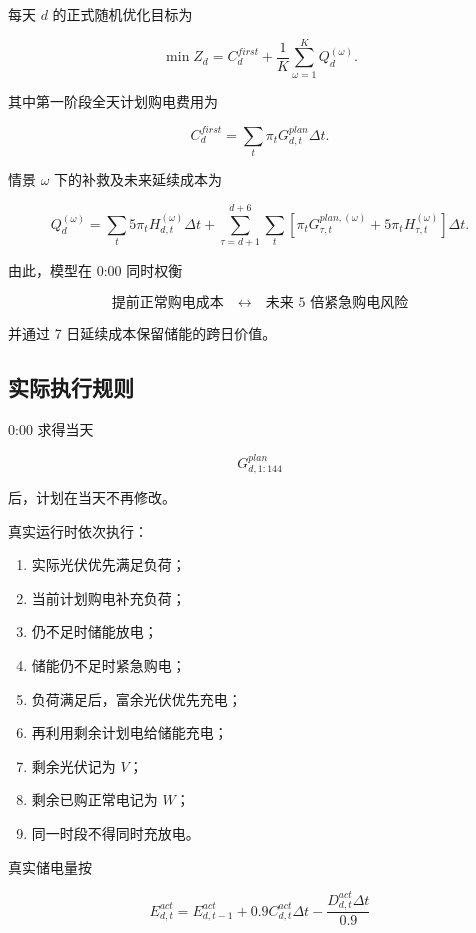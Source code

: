 每天 \(d\) 的正式随机优化目标为

\begin{equation}
\min Z_d
=
C_d^{first}
+
\frac1K
\sum_{\omega=1}^{K}
Q_d^{(\omega)}.
\end{equation}

其中第一阶段全天计划购电费用为

\begin{equation}
C_d^{first}
=
\sum_t
\pi_tG^{plan}_{d,t}\Delta t.
\end{equation}

情景 \(\omega\) 下的补救及未来延续成本为

\begin{equation}
Q_d^{(\omega)}
=
\sum_t
5\pi_tH_{d,t}^{(\omega)}\Delta t
+
\sum_{\tau=d+1}^{d+6}\sum_t
\left[
\pi_tG_{\tau,t}^{plan,(\omega)}
+
5\pi_tH_{\tau,t}^{(\omega)}
\right]\Delta t.
\end{equation}

由此，模型在 0:00 同时权衡

\[
\boxed{
\text{提前正常购电成本}
\quad\longleftrightarrow\quad
\text{未来 5 倍紧急购电风险}
}
\]

并通过 7 日延续成本保留储能的跨日价值。

\subsection{实际执行规则}

0:00 求得当天

\[
G^{plan}_{d,1:144}
\]

后，计划在当天不再修改。

真实运行时依次执行：

\begin{enumerate}
\item 实际光伏优先满足负荷；
\item 当前计划购电补充负荷；
\item 仍不足时储能放电；
\item 储能仍不足时紧急购电；
\item 负荷满足后，富余光伏优先充电；
\item 再利用剩余计划电给储能充电；
\item 剩余光伏记为 \(V\)；
\item 剩余已购正常电记为 \(W\)；
\item 同一时段不得同时充放电。
\end{enumerate}

真实储电量按

\begin{equation}
E^{act}_{d,t}
=
E^{act}_{d,t-1}
+
0.9C^{act}_{d,t}\Delta t
-
\frac{D^{act}_{d,t}\Delta t}{0.9}
\end{equation}

